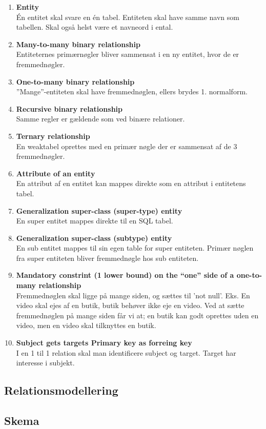 \begin{enumerate}
	\item \textbf{Entity}\\
	Én entitet skal svare en én tabel. Entiteten skal have samme navn som tabellen. Skal også helst være et navneord i ental. 
	
	\item \textbf{Many-to-many binary relationship}\\
	Entiteternes primærnøgler bliver sammensat i en ny entitet, hvor de er fremmednøgler.
	
	\item \textbf{One-to-many binary relationship}\\
	''Mange''-entiteten skal have fremmednøglen, ellers brydes 1. normalform.
	
	\item \textbf{Recursive binary relationship}\\
	Samme regler er gældende som ved binære relationer.
	
	\item \textbf{Ternary relationship}\\
	En weaktabel oprettes med en primær nøgle der er sammensat af de 3 fremmednøgler.
	
	\item \textbf{Attribute of an entity}\\
	En attribut af en entitet kan mappes direkte som en attribut i entitetens tabel.
	
	\item \textbf{Generalization super-class (super-type) entity}\\
	En super entitet mappes direkte til en SQL tabel.
	
	\item \textbf{Generalization super-class (subtype) entity}\\
	En sub entitet mappes til sin egen table for super entiteten. Primær nøglen fra super entiteten
	bliver fremmednøgle hos sub entiteten.
	
	\item \textbf{Mandatory constrint (1 lower bound) on the “one” side of a one-to-many relationship}\\
	Fremmednøglen skal ligge på mange siden, og sættes til ’not null’. Eks. En video skal ejes af en
	butik, butik behøver ikke eje en video. Ved at sætte fremmednøglen på mange siden får vi at; en
	butik kan godt oprettes uden en video, men en video skal tilknyttes en butik.
	
	\item \textbf{Subject gets targets Primary key as forreing key}\\
	I en 1 til 1 relation skal man identificere subject og target. Target har interesse i subjekt.
	
\end{enumerate}

\subsection{Relationsmodellering}

\subsection{Skema}
